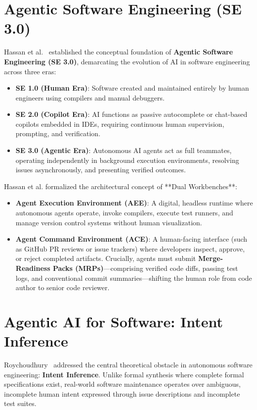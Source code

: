 \documentclass[12pt,a4paper]{report}
\begin{document}
\section{Agentic Software Engineering (SE 3.0)}
Hassan et al.~\cite{hassan2025agentic} established the conceptual foundation of \textbf{Agentic Software Engineering (SE 3.0)}, demarcating the evolution of AI in software engineering across three eras:
\begin{itemize}
    \item \textbf{SE 1.0 (Human Era)}: Software created and maintained entirely by human engineers using compilers and manual debuggers.
    \item \textbf{SE 2.0 (Copilot Era)}: AI functions as passive autocomplete or chat-based copilots embedded in IDEs, requiring continuous human supervision, prompting, and verification.
    \item \textbf{SE 3.0 (Agentic Era)}: Autonomous AI agents act as full teammates, operating independently in background execution environments, resolving issues asynchronously, and presenting verified outcomes.
\end{itemize}

Hassan et al. formalized the architectural concept of **Dual Workbenches**:
\begin{itemize}
    \item \textbf{Agent Execution Environment (AEE)}: A digital, headless runtime where autonomous agents operate, invoke compilers, execute test runners, and manage version control systems without human visualization.
    \item \textbf{Agent Command Environment (ACE)}: A human-facing interface (such as GitHub PR reviews or issue trackers) where developers inspect, approve, or reject completed artifacts. Crucially, agents must submit \textbf{Merge-Readiness Packs (MRPs)}---comprising verified code diffs, passing test logs, and conventional commit summaries---shifting the human role from code author to senior code reviewer.
\end{itemize}

\section{Agentic AI for Software: Intent Inference}
Roychoudhury~\cite{roychoudhury2025agentic} addressed the central theoretical obstacle in autonomous software engineering: \textbf{Intent Inference}. Unlike formal synthesis where complete formal specifications exist, real-world software maintenance operates over ambiguous, incomplete human intent expressed through issue descriptions and incomplete test suites.
\end{document}
